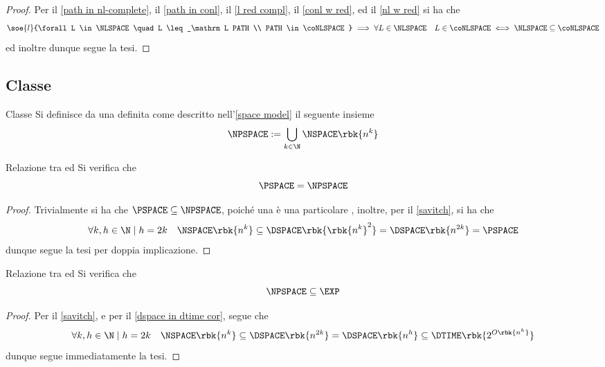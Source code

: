 \documentclass[a4paper, 12pt]{report}
\begin{document}
    \begin{proof}
        Per il \cref{path in nl-complete}, il \cref{path in conl}, il \cref{l red compl}, il \cref{conl w red}, ed il \cref{nl w red} si ha che $$\soe{l}{\forall L \in \NLSPACE \quad L \leq_\mathrm L PATH \\ PATH \in \coNLSPACE} \implies \forall L \in \NLSPACE \quad L \in \coNLSPACE \iff \NLSPACE \subseteq \coNLSPACE$$ ed inoltre  dunque segue la tesi.
    \end{proof}

    \subsection{Classe \NPSPACE}

    \begin{frameddefn}{Classe \NPSPACE}
        Si definisce  da una \NTM definita come descritto nell'\cref{space model} il seguente insieme $$\NPSPACE := \bigcup_{k \in \N}{\NSPACE \rbk{n^k}}$$
    \end{frameddefn}

    \begin{framedprop}[label={pspace = npspace}]{Relazione tra \PSPACE ed \NPSPACE}
        Si verifica che $$\PSPACE = \NPSPACE$$
    \end{framedprop}

    \begin{proof}
        Trivialmente si ha che $\PSPACE \subseteq \NPSPACE$, poiché una \TM è una particolare \NTM, inoltre, per il \cref{savitch}, si ha che $$\forall k, h \in \N \mid h = 2k \quad \NSPACE \rbk{n^k} \subseteq \DSPACE \rbk{\rbk{n^k}^2} = \DSPACE \rbk{n^{2k}} = \PSPACE$$ dunque segue la tesi per doppia implicazione.
    \end{proof}

    \begin{framedprop}{Relazione tra \NPSPACE ed \EXP}
        Si verifica che $$\NPSPACE \subseteq \EXP$$
    \end{framedprop}

    \begin{proof}
        Per il \cref{savitch}, e per il \cref{dspace in dtime cor}, segue che $$\forall k, h \in \N \mid h = 2k \quad \NSPACE \rbk{n^k} \subseteq \DSPACE \rbk{n^{2k}} = \DSPACE \rbk{n^{h}} \subseteq \DTIME \rbk{2^{O \rbk{n^h}}}$$ dunque segue immediatamente la tesi.
    \end{proof}
\end{document}
